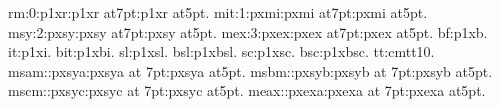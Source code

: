 \newfont      rm:0:p1xr:p1xr at7pt:p1xr at5pt.
\newmathfont mit:1:pxmi:pxmi at7pt:pxmi at5pt.
\newmathfont msy:2:pxsy:pxsy at7pt:pxsy at5pt.
\newmathfont mex:3:pxex:pxex at7pt:pxex at5pt.
\newtextfont  bf:p1xb.
\newtextfont  it:p1xi.
\newtextfont bit:p1xbi.
\newtextfont  sl:p1xsl.
\newtextfont bsl:p1xbsl.
\newtextfont  sc:p1xsc.
\newtextfont bsc:p1xbsc.
\newtextfont  tt:cmtt10.
\newfam\msam \newfam\msbm \newfam\mscm \newfam\meax
\newmathfont msam:\msam:pxsya:pxsya at 7pt:pxsya at5pt.
\newmathfont msbm:\msbm:pxsyb:pxsyb at 7pt:pxsyb at5pt.
\newmathfont mscm:\mscm:pxsyc:pxsyc at 7pt:pxsyc at5pt.
\newmathfont meax:\meax:pxexa:pxexa at 7pt:pxexa at5pt.
\rm
